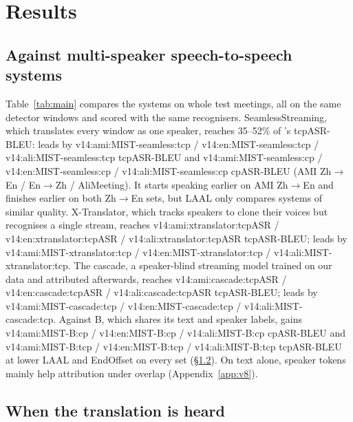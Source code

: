 \section{Results}
\label{sec:results}

\subsection{Against multi-speaker speech-to-speech systems}
\label{sec:res-sys}
\label{sec:res-offline}
\label{sec:res-overlap}



Table~\ref{tab:main} compares the systems on whole test meetings, all on the same detector windows and scored with the
same recognisers. SeamlessStreaming, which translates every window as one speaker, reaches 35--52\% of \sys{}'s
tcpASR-BLEU: \sys{} leads by \num{v14:ami:MIST-seamless:tcp} / \num{v14:en:MIST-seamless:tcp} /
\num{v14:ali:MIST-seamless:tcp} tcpASR-BLEU and \num{v14:ami:MIST-seamless:cp} / \num{v14:en:MIST-seamless:cp} /
\num{v14:ali:MIST-seamless:cp} cpASR-BLEU (AMI Zh$\rightarrow$En / En$\rightarrow$Zh / AliMeeting). It starts speaking
earlier on AMI Zh$\rightarrow$En and finishes earlier on both Zh$\rightarrow$En sets, but LAAL only compares systems of
similar quality.\ifXT{} X-Translator, which tracks speakers to clone their voices but recognises a single stream, reaches
\num{v14:ami:xtranslator:tcpASR} / \num{v14:en:xtranslator:tcpASR} / \num{v14:ali:xtranslator:tcpASR} tcpASR-BLEU;
\sys{} leads by \num{v14:ami:MIST-xtranslator:tcp} / \num{v14:en:MIST-xtranslator:tcp} /
\num{v14:ali:MIST-xtranslator:tcp}.\fi\ifCascade{} The cascade, a speaker-blind streaming model trained on our data
and attributed afterwards, reaches \num{v14:ami:cascade:tcpASR} / \num{v14:en:cascade:tcpASR} /
\num{v14:ali:cascade:tcpASR} tcpASR-BLEU; \sys{} leads by \num{v14:ami:MIST-cascade:tcp} /
\num{v14:en:MIST-cascade:tcp} / \num{v14:ali:MIST-cascade:tcp}.\fi{} Against B, which shares its text and speaker
labels, \sys{} gains \num{v14:ami:MIST-B:cp} / \num{v14:en:MIST-B:cp} / \num{v14:ali:MIST-B:cp} cpASR-BLEU and
\num{v14:ami:MIST-B:tcp} / \num{v14:en:MIST-B:tcp} / \num{v14:ali:MIST-B:tcp} tcpASR-BLEU at lower LAAL and EndOffset
on every set (\S\ref{sec:res-pa}). On text alone, speaker tokens mainly help attribution under overlap
(Appendix~\ref{app:v8}).

\subsection{When the translation is heard}
\label{sec:res-pa}
\label{sec:res-v10}

